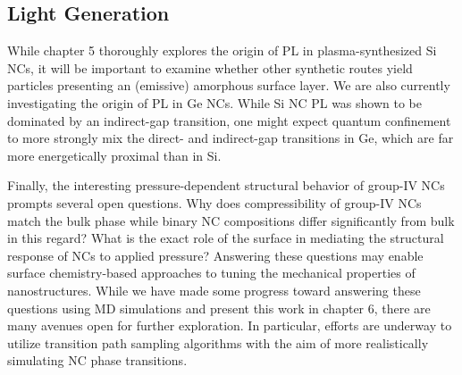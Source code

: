 \subsection{Light Generation}
While chapter 5 thoroughly explores the origin of PL in plasma-synthesized Si NCs, it will be important to examine whether other synthetic routes yield particles presenting an (emissive) amorphous surface layer. We are also currently investigating the origin of PL in Ge NCs. While Si NC PL was shown to be dominated by an indirect-gap transition, one might expect quantum confinement to more strongly mix the direct- and indirect-gap transitions in Ge, which are far more energetically proximal than in Si. \par
Finally, the interesting pressure-dependent structural behavior of group-IV NCs prompts several open questions. Why does compressibility of group-IV NCs match the bulk phase while binary NC compositions differ significantly from bulk in this regard? What is the exact role of the surface in mediating the structural response of NCs to applied pressure? Answering these questions may enable surface chemistry-based approaches to tuning the mechanical properties of nanostructures. While we have made some progress toward answering these questions using MD simulations and present this work in chapter 6, there are many avenues open for further exploration. In particular, efforts are underway to utilize transition path sampling algorithms with the aim of more realistically simulating NC phase transitions. 